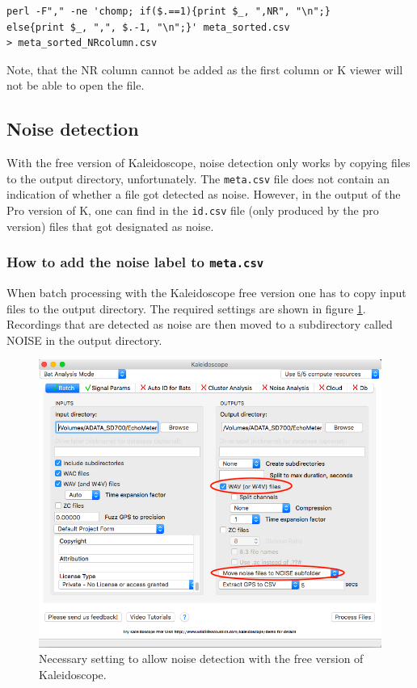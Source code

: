 \documentclass[English, 11pt, twoside, authoryear]{article}
\begin{document}
\begin{lstlisting}
perl -F"," -ne 'chomp; if($.==1){print $_, ",NR", "\n";}
else{print $_, ",", $.-1, "\n";}' meta_sorted.csv 
> meta_sorted_NRcolumn.csv
\end{lstlisting}

Note, that the NR column cannot be added as the first column or \textsf{K} viewer will not be able to open the file.

%
%
%
\subsection{Noise detection}
%
%
%

With the free version of Kaleidoscope, noise detection only works by copying files to the output directory, unfortunately. The \texttt{meta.csv} file does not contain an indication of whether a file got detected as noise. However, in the output of the Pro version of \textsf{K}, one can find in the \texttt{id.csv} file (only produced by the pro version) files that got designated as noise.

%
%
%
\subsubsection{How to add the noise label to \texttt{meta.csv}}
%
%
%
When batch processing with the Kaleidoscope free version one has to copy input files to the output directory. The required settings are shown in figure \ref{Batch_proc_for_noise_detection}. Recordings that are detected as noise are then moved to a subdirectory called NOISE in the output directory.

\begin{figure}[htbp]
\begin{center}
\includegraphics[width=.7\textwidth]{Fig/Batch_proc_for_noise_detection}
\caption{Necessary setting to allow noise detection with the free version of Kaleidoscope.}
\label{Batch_proc_for_noise_detection}
\end{center}
\end{figure}
\end{document}
